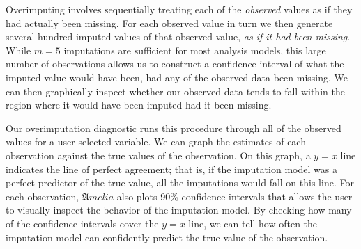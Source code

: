 \documentclass[12pt,titlepage]{article}
\newcommand{\Amelia}{\ensuremath{\mathfrak Amelia} }
\begin{document}
Overimputing involves sequentially treating each of the
\emph{observed} values as if they had actually been missing.  For each
observed value in turn we then generate several hundred imputed values
of that observed value, \emph{as if it had been missing}.  While $m=5$
imputations are sufficient for most analysis models, this large number
of observations allows us to construct a confidence interval of what
the imputed value would have been, had any of the observed data been
missing.  We can then graphically inspect whether our observed data
tends to fall within the region where it would have been imputed had
it been missing.


Our overimputation diagnostic runs this procedure through all of the
observed values for a user selected variable.  We can graph the
estimates of each observation against the true values of the
observation.  On this graph, a $y=x$ line indicates the line of
perfect agreement; that is, if the imputation model was a perfect
predictor of the true value, all the imputations would fall on this
line.  For each observation, \Amelia also plots 90\% confidence
intervals that allows the user to visually inspect the behavior of the
imputation model. By checking how many of the confidence intervals
cover the $y=x$ line, we can tell how often the imputation model can
confidently predict the true value of the observation.
\end{document}
